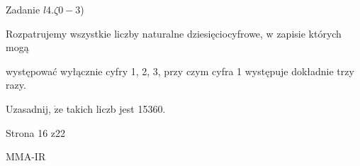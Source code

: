 \documentclass[a4paper,12pt]{article}
\begin{document}
Zadanie $l4. \zeta 0-3$)

Rozpatrujemy wszystkie liczby naturalne dziesięciocyfrowe, w zapisie których mogą

występować wyłącznie cyfry 1, 2, 3, przy czym cyfra 1 występuje dokładnie trzy razy.

Uzasadnij, $\dot{\mathrm{z}}\mathrm{e}$ takich liczb jest 15360.

Strona 16 z22

MMA-IR
\end{document}
